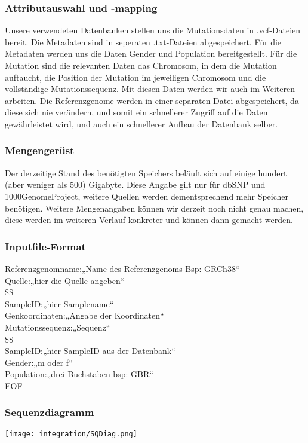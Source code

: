 \documentclass{scrartcl}
\begin{document}
\subsubsection{Attributauswahl und -mapping}
Unsere verwendeten Datenbanken stellen uns die Mutationsdaten in .vcf-Dateien bereit. Die Metadaten sind in seperaten .txt-Dateien abgespeichert. Für die Metadaten werden uns die Daten Gender und Population bereitgestellt. Für die Mutation sind die relevanten Daten das Chromosom, in dem die Mutation auftaucht, die Position der Mutation im jeweiligen Chromosom und die vollständige Mutationssequenz. Mit diesen Daten werden wir auch im Weiteren arbeiten. Die Referenzgenome werden in einer separaten Datei abgespeichert, da diese sich nie verändern, und somit ein schnellerer Zugriff auf die Daten gewährleistet wird, und auch ein schnellerer Aufbau der Datenbank selber.
\subsubsection{Mengengerüst}
Der derzeitige Stand des benötigten Speichers beläuft sich auf einige hundert (aber weniger als 500) Gigabyte. Diese Angabe gilt nur für dbSNP und 1000GenomeProject, weitere Quellen werden dementsprechend mehr Speicher benötigen. Weitere Mengenangaben können wir derzeit noch nicht genau machen, diese werden im weiteren Verlauf konkreter und können dann gemacht werden.
\subsubsection{Inputfile-Format}
Referenzgenomname:„Name des Referenzgenoms Bsp: GRCh38“\\
Quelle:„hier die Quelle angeben“\\
\$\$\\
SampleID:„hier Samplename“\\
Genkoordinaten:„Angabe der Koordinaten“ \\
Mutationssequenz:„Sequenz“\\
\$\$\\
SampleID:„hier SampleID aus der Datenbank“\\
Gender:„m oder f“\\
Population:„drei Buchstaben bsp: GBR“ \\
EOF\\
\subsubsection{Sequenzdiagramm}
\texttt{[image: integration/SQDiag.png]}
\end{document}
